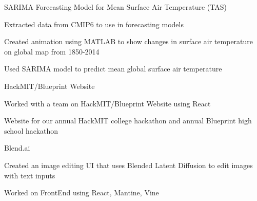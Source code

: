 \documentclass[12pt, letterpaper]{awesome-cv}
\begin{document}


\begin{cventries}
  \cventry
    {} %
    {SARIMA Forecasting Model for Mean Surface Air Temperature (TAS)} %
    {} %
    {} %
    {
      \vspace{-0.2in}
      \begin{cvitems} %
        \item {Extracted data from CMIP6 to use in forecasting models}
        \item {Created animation using MATLAB to show changes in surface air temperature on global map from 1850-2014}
        \item {Used SARIMA model to predict mean global surface air temperature}
      \end{cvitems}
    }

  \cventry
    {} %
    {HackMIT/Blueprint Website} %
    {} %
    {} %
    {
      \vspace{-0.2in}
      \begin{cvitems} %
        \item {Worked with a team on HackMIT/Blueprint Website using React}
        \item {Website for our annual HackMIT college hackathon and annual Blueprint high school hackathon}
      \end{cvitems}
    }

  \cventry
    {} %
    {Blend.ai} %
    {} %
    {} %
    {
      \vspace{-0.2in}
      \begin{cvitems} %
        \item {Created an image editing UI that uses Blended Latent Diffusion to edit images with text inputs}
        \item {Worked on FrontEnd using React, Mantine, Vine}
      \end{cvitems}
    }
\end{cventries}
\end{document}
